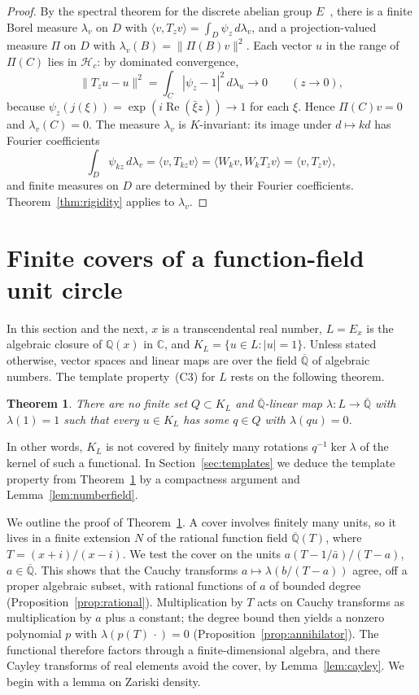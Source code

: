 \documentclass[10pt]{article}
\newtheorem{thm}{Theorem}[section]
\theoremstyle{remark}
\newcommand{\C}{\mathbb C}
\newcommand{\Q}{\mathbb Q}
\newcommand{\Qbar}{\overline{\mathbb Q}}
\newcommand{\calH}{\mathcal H}
\DeclareMathOperator{\re}{Re}
\begin{document}
\begin{proof}
By the spectral theorem for the discrete abelian group $E$~\cite[Theorem~D.3.1]{BHV}, there is a finite Borel measure $\lambda_v$ on $D$ with $\langle v,T_zv\rangle=\int_D\psi_z\,d\lambda_v$, and a projection-valued measure $\Pi$ on $D$ with $\lambda_v(B)=\|\Pi(B)v\|^2$. Each vector $u$ in the range of $\Pi(C)$ lies in $\calH_c$: by dominated convergence,
\[
 \|T_zu-u\|^2=\int_C|\psi_z-1|^2\,d\lambda_u\longrightarrow0\qquad(z\to0),
\]
because $\psi_z(j(\xi))=\exp(i\re(\bar\xi z))\to1$ for each $\xi$. Hence $\Pi(C)v=0$ and $\lambda_v(C)=0$. The measure $\lambda_v$ is $K$-invariant: its image under $d\mapsto kd$ has Fourier coefficients
\[
 \int_D\psi_{kz}\,d\lambda_v=\langle v,T_{kz}v\rangle=\langle W_kv,W_kT_zv\rangle=\langle v,T_zv\rangle,
\]
and finite measures on $D$ are determined by their Fourier coefficients. Theorem~\ref{thm:rigidity} applies to $\lambda_v$.
\end{proof}

\section{Finite covers of a function-field unit circle}\label{sec:template}

In this section and the next, $x$ is a transcendental real number, $L=E_x$ is the algebraic closure of $\Q(x)$ in $\C$, and $K_L=\{u\in L:|u|=1\}$. Unless stated otherwise, vector spaces and linear maps are over the field $\Qbar$ of algebraic numbers. The template property~(C3) for $L$ rests on the following theorem.

\begin{thm}\label{thm:nocover}
There are no finite set $Q\subset K_L$ and $\Qbar$-linear map $\lambda\colon L\to\Qbar$ with $\lambda(1)=1$ such that every $u\in K_L$ has some $q\in Q$ with $\lambda(qu)=0$.
\end{thm}

In other words, $K_L$ is not covered by finitely many rotations $q^{-1}\ker\lambda$ of the kernel of such a functional. In Section~\ref{sec:templates} we deduce the template property from Theorem~\ref{thm:nocover} by a compactness argument and Lemma~\ref{lem:numberfield}.

We outline the proof of Theorem~\ref{thm:nocover}. A cover involves finitely many units, so it lives in a finite extension $N$ of the rational function field $\Qbar(T)$, where $T=(x+i)/(x-i)$. We test the cover on the units $a(T-1/\bar a)/(T-a)$, $a\in\Qbar$. This shows that the Cauchy transforms $a\mapsto\lambda(b/(T-a))$ agree, off a proper algebraic subset, with rational functions of $a$ of bounded degree (Proposition~\ref{prop:rational}). Multiplication by $T$ acts on Cauchy transforms as multiplication by $a$ plus a constant; the degree bound then yields a nonzero polynomial $p$ with $\lambda(p(T)\,\cdot)=0$ (Proposition~\ref{prop:annihilator}). The functional therefore factors through a finite-dimensional algebra, and there Cayley transforms of real elements avoid the cover, by Lemma~\ref{lem:cayley}. We begin with a lemma on Zariski density.
\end{document}
